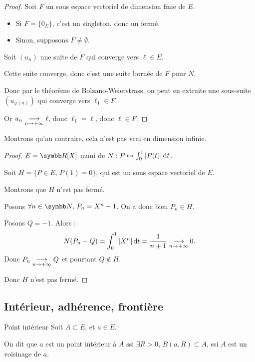 \begin{proof}
    Soit $F$ un sous espace vectoriel de dimension finie de $E$. 
    \begin{itemize}
        \item Si $F = \{0_E\}$, c'est un singleton, donc un fermé.
        \item Sinon, supposons $F \neq \emptyset$. 
    \end{itemize}

    Soit $(u_n)$ une suite de $F$ qui converge vers $\ell \in E$.

    Cette suite converge, donc c'est une suite bornée de $F$ pour $N$. 

    Donc par le théorème de Bolzano-Weierstrass, on peut en extraite une sous-suite $(u_{\varphi(n)})$ qui converge vers
    $\ell_1 \in F$.

    Or $u_n \underset{n \to + \infty}{\longrightarrow} \ell$, donc $\ell_1 = \ell$, donc $\ell \in F$.
\end{proof}

Montrons qu'au contraire, cela n'est pas vrai en dimension infinie.

\begin{proof}
    $E = \R [X]$ muni de $N: P \mapsto \int_{0}^1 |P(t)| \,\mathrm{d}t$.

    Soit $H = \{P \in E, \, P(1) = 0\}$, qui est un sous espace vectoriel de $E$.

    Montrons que $H$ n'est pas fermé.

    Posons $\forall n \in \N, \, P_n = X^n - 1$. On a donc bien $P_n \in H$.

    Posons $Q = -1$. Alors :
    \[N(P_n - Q ) = \int_0^1 |X^n| \,\mathrm{d}t = \frac 1 {n+1} \underset{n \to + \infty}{\longrightarrow} 0.\]
    Donc $P_n \underset{n \to + \infty}{\longrightarrow} Q$ et pourtant $Q \not \in H$.

    Donc $H$ n'est pas fermé.
\end{proof}

\subsection{Intérieur, adhérence, frontière}

\begin{definition}{Point intérieur}{}
    Soit $A \subset E$, et $a \in E$.

    On dit que $a$ est un point intérieur à $A$ ssi $\exists R > 0, \, B(a, R) \subset A$,
    ssi $A$ est un voisinage de $a$. 
\end{definition}

